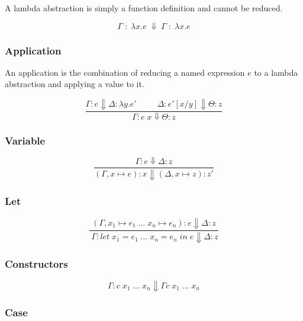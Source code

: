 A lambda abstraction is simply a function definition and cannot be reduced.

\begin{equation}
\Gamma \; : \; \lambda x . e \; \Downarrow \; \Gamma \; : \; \lambda x . e
\end{equation}

\subsubsection{Application}


An application is the combination of reducing a named expression $e$ to a lambda abstraction
and applying a value to it.

\begin{equation}
\dfrac{\Gamma : e \Downarrow \Delta : \lambda y . e' \;\;\;\;\;\;\;\;\; \Delta : e' [x/y] \Downarrow \Theta : z }{ \Gamma : e \; x \Downarrow \Theta : z}
\end{equation}

\subsubsection{Variable}



\begin{equation}
\dfrac{\Gamma : e \Downarrow \Delta : z}{( \Gamma , x \mapsto e) : x \Downarrow (\Delta , x \mapsto z) : z' }
\end{equation}

\subsubsection{Let}

\begin{equation}
\dfrac{(\Gamma , x_1 \mapsto e_1 \; ... \; x_n \mapsto e_n) : e \Downarrow \Delta : z}{ \
\Gamma : let \; x_1 = e_1 \; ... \; x_n = e_n \; in \; e \Downarrow \Delta : z }
\end{equation}


\subsubsection{Constructors}

\begin{equation}
\Gamma : c \; x_1 \; ... \; x_n \Downarrow \Gamma c \; x_1 \; ... \; x_n
\end{equation}

\subsubsection{Case}

